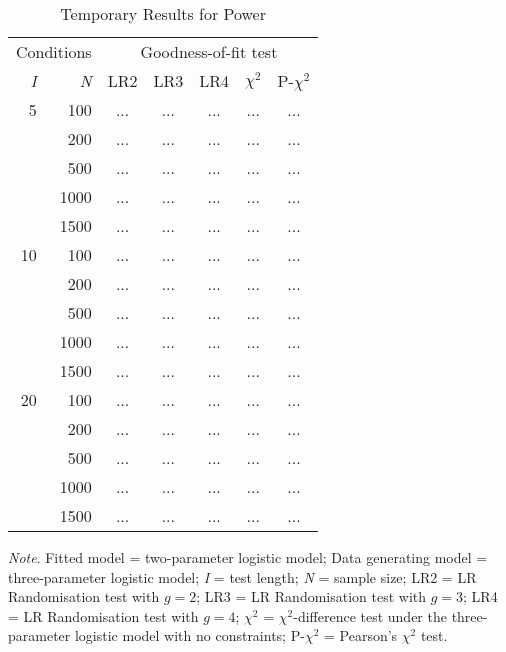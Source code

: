 \documentclass[Royal,sageapa,times,doublespace]{sagej}
\begin{document}
\begin{table}[b!]
\caption{Temporary Results for Power}
\begin{tabular}{ r r | c c c c c }
\toprule
\multicolumn{2}{c}{Conditions} & \multicolumn{5}{c}{Goodness-of-fit test} \\
\textit{I} & \textit{N} & LR2 & LR3 & LR4 & $\chi^2$ & P-$\chi^2$ \\
\midrule
5 & 100 & ... & ... & ... & ... & ... \\ 
& 200 & ... & ... & ... & ... & ... \\
& 500 & ... & ... & ... & ... & ... \\
& 1000 & ... & ... & ... & ... & ... \\
& 1500 & ... & ... & ... & ... & ... \\
10 & 100 & ... & ... & ... & ... & ... \\ 
& 200 & ... & ... & ... & ... & ... \\
& 500 & ... & ... & ... & ... & ... \\
& 1000 & ... & ... & ... & ... & ... \\
& 1500 & ... & ... & ... & ... & ... \\
20 & 100 & ... & ... & ... & ... & ... \\ 
& 200 & ... & ... & ... & ... & ... \\
& 500 & ... & ... & ... & ... & ... \\
& 1000 & ... & ... & ... & ... & ... \\
& 1500 & ... & ... & ... & ... & ... \\
\bottomrule
\end{tabular}

\bigskip
\small\textit{Note}. Fitted model = two-parameter logistic model; Data generating model = three-parameter logistic model; \textit{I} = test length; \textit{N} = sample size; LR2 = LR Randomisation test with $g = 2$; LR3 = LR Randomisation test with $g = 3$; LR4 = LR Randomisation test with $g = 4$; $\chi^2$ = $\chi^2$-difference test under the three-parameter logistic model with no constraints; P-$\chi^2$ = Pearson's $\chi^2$ test.
\label{tab:3}
\end{table}
\end{document}
